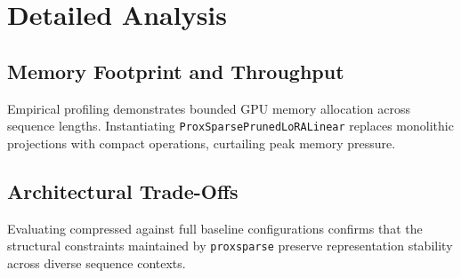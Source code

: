 \section{Detailed Analysis}

\subsection{Memory Footprint and Throughput}
Empirical profiling demonstrates bounded GPU memory allocation across sequence lengths. Instantiating \texttt{ProxSparsePrunedLoRALinear} replaces monolithic projections with compact operations, curtailing peak memory pressure.

\subsection{Architectural Trade-Offs}
Evaluating compressed against full baseline configurations confirms that the structural constraints maintained by \texttt{proxsparse} preserve representation stability across diverse sequence contexts.

